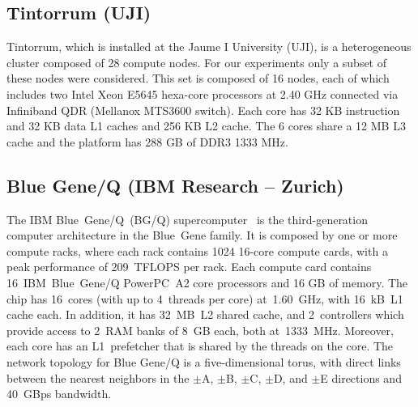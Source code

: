 \subsection{Tintorrum (UJI)}
Tintorrum, which  is installed at the  Jaume I University  (UJI), is a
heterogeneous  cluster   composed  of  28  compute   nodes.   For  our
experiments only a subset of  these nodes were considered. This set is
composed  of 16 nodes,  each of  which includes  two Intel  Xeon E5645
hexa-core  processors  at  2.40   GHz  connected  via  Infiniband  QDR
(Mellanox MTS3600 switch).  Each core  has 32 KB instruction and 32 KB
data L1 caches and 256 KB L2 cache. The 6 cores share a 12 MB L3 cache
and the platform has 288 GB of DDR3 1333 MHz.

\subsection{Blue Gene/Q (IBM Research -- Zurich)}
The IBM Blue~Gene/Q~(BG/Q) supercomputer~\cite{IBMRedBookBGQHardware} is the
third-generation computer architecture in the Blue~Gene family. It is composed
by one or more compute racks, where each rack contains 1024 16-core compute cards,
with a peak performance of 209~TFLOPS per rack. Each compute card contains 16~IBM~Blue~Gene/Q
PowerPC~A2 core processors and 16 GB of memory. The chip has 16~cores (with
up to 4~threads per core) at~1.60~GHz, with 16~kB~L1 cache each. In addition,
it has 32~MB~L2 shared cache, and 2~controllers which provide access to 2~RAM banks
of 8~GB each, both at~1333~MHz. Moreover, each core has an L1~prefetcher that is shared by
the threads on the core. The network topology for Blue Gene/Q is a five-dimensional torus,
with direct links between the nearest neighbors in the $\pm$A, $\pm$B, $\pm$C, $\pm$D, and $\pm$E
directions and 40~GBps bandwidth.
